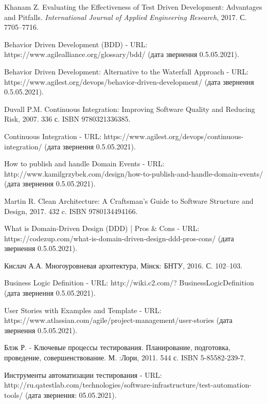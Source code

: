 \begin{thebibliography}{00}
			Khanam Z.
			Evaluating the Effectiveness of Test Driven Development: Advantages and Pitfalls.
      \emph{International Journal of Applied Engineering Research},
      2017. С. 7705–7716.
	
			Behavior Driven Development (BDD) -
			URL: https://www.agilealliance.org/glossary/bdd/
			(дата звернення 0.5.05.2021).

			Behavior Driven Development: Alternative to the Waterfall Approach -
			URL: https://www.agilest.org/devops/behavior-driven-development/
			(дата звернення 0.5.05.2021).
	
			Duvall P.M. 
			Continuous Integration: Improving Software Quality and Reducing Risk,
			2007. 336 с. ISBN 9780321336385.
	
			Continuous Integration -
			URL: https://www.agilest.org/devops/continuous-integration/
			(дата звернення 0.5.05.2021).
	
			How to publish and handle Domain Events -
			URL: http://www.kamilgrzybek.com/design/how-to-publish-and-handle-domain-events/
			(дата звернення 0.5.05.2021).

			Martin R.
			Clean Architecture: A Craftsman's Guide to Software Structure and Design,
			2017. 432 c. ISBN 9780134494166.
	
			What is Domain-Driven Design (DDD) | Pros \& Cons -
			URL: https://codezup.com/what-is-domain-driven-design-ddd-pros-cons/
			(дата звернення 0.5.05.2021).
	
			Кислач А.А.
			Многоуровневая архитектура,
			Мінск: БНТУ, 2016. С. 102–103.
	
			Business Logic Definition -
			URL: http://wiki.c2.com/?
      BusinessLogicDefinition (дата звернення 0.5.05.2021).
	
			User Stories with Examples and Template -
			URL: https://www.atlassian.com/agile/project-management/user-stories
			(дата звернення 0.5.05.2021).

      Блэк Р. -
      Ключевые процессы тестирования.
      Планирование, подготовка, проведение, совершенствование. М. :Лори,
      2011. 544 с. ISBN 5-85582-239-7.

      Инструменты автоматизации тестирования -
      URL: http://ru.qatestlab.com/technologies/software-infrastructure/test-automation-tools/
      (дата звернення: 05.05.2021).


\end{thebibliography}
